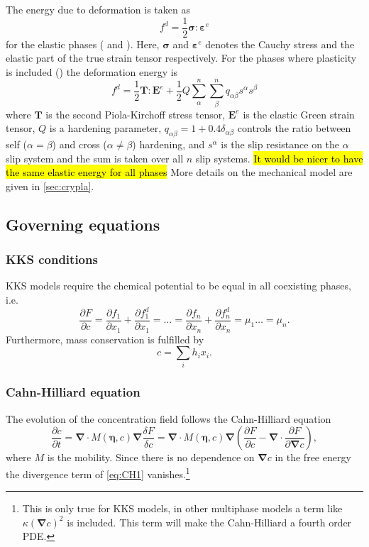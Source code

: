 \documentclass[12pt,a4paper]{article}
\newcommand{\vardiff}[2]{\frac{\delta#1}{\delta#2}}
\newcommand{\partdiff}[2]{\frac{\partial#1}{\partial#2}}
\providecommand{\vbf}[1]{\boldsymbol{#1}}
\providecommand{\gradient}[0]{\vbf{\nabla}}
\begin{document}
The energy due to deformation is taken as 
\begin{equation}
  f^d = \frac{1}{2}\vbf{\sigma}:\vbf{\varepsilon}^e
\end{equation}
for the elastic phases ( and ).
Here, $\vbf{\sigma}$ and $\vbf{\varepsilon}^e$ denotes the Cauchy stress and the elastic part of the true strain tensor respectively.
For the phases where plasticity is included () the deformation energy is
\begin{equation}
  f^d = \frac{1}{2}\vbf{T}:\vbf{E}^e+\frac{1}{2}Q\sum_\alpha^n\sum_\beta^n q_{\alpha\beta}s^\alpha s^\beta
\end{equation}
where $\vbf{T}$ is the second Piola-Kirchoff stress tensor, $\vbf{E}^e$ is the elastic Green strain tensor, $Q$ is a hardening parameter, $q_{\alpha\beta}=1+0.4\delta_{\alpha\beta}$ controls the ratio between self ($\alpha=\beta$) and cross ($\alpha\neq\beta$) hardening, and $s^\alpha$ is the slip resistance on the $\alpha$ slip system and the sum is taken over all $n$ slip systems. \hl{It would be nicer to have the same elastic energy for all phases}
More details on the mechanical model are given in \cref{sec:crypla}.

\subsection{Governing equations}
\subsubsection{KKS conditions}
KKS models require the chemical potential to be equal in all coexisting phases, i.e.
\begin{equation}
  \partdiff{F}{c}=\partdiff{f_1}{x_1}+\partdiff{f^d_1}{x_1}=\dots=\partdiff{f_n}{x_n}+\partdiff{f^d_n}{x_n}=\mu_1\dots=\mu_n.
  \label{eq:KKS}
\end{equation}
Furthermore, mass conservation is fulfilled by
\begin{equation}
  c=\sum_ih_ix_i.
  \label{eq:mass}
\end{equation}
\subsubsection{Cahn-Hilliard equation}
The evolution of the concentration field follows the Cahn-Hilliard equation
\begin{equation}
  \partdiff{c}{t}=\gradient\cdot M(\vbf{\eta},c)\gradient \vardiff{F}{c}=\gradient\cdot M(\vbf{\eta},c)\gradient\left(\partdiff{F}{c}-\gradient\cdot\partdiff{F}{\gradient c}\right),
  \label{eq:CH1}
\end{equation}
where $M$ is the mobility.
Since there is no dependence on $\gradient c$ in the free energy the divergence term of \cref{eq:CH1} vanishes.\footnote{This is only true for KKS models, in other multiphase models a term like $\kappa\left(\gradient c\right)^2$ is included.
This term will make the Cahn-Hilliard a fourth order PDE.}
\end{document}
